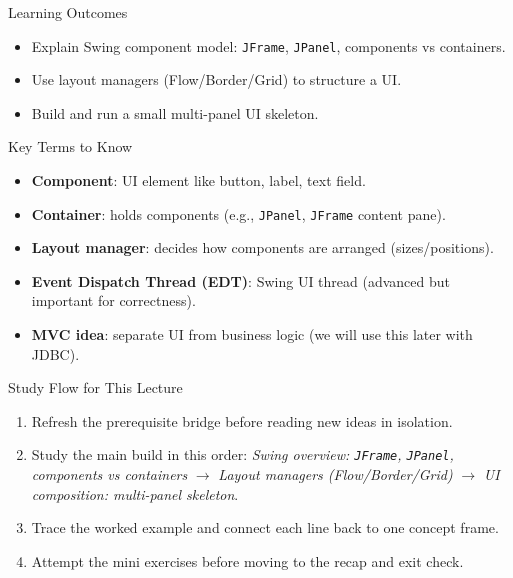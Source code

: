 \documentclass{beamer}
\begin{document}
\begin{frame}{Learning Outcomes}
  \begin{itemize}[<+->]
    \item Explain Swing component model: \texttt{JFrame}, \texttt{JPanel}, components vs containers.
    \item Use layout managers (Flow/Border/Grid) to structure a UI.
    \item Build and run a small multi-panel UI skeleton.
  \end{itemize}
  \slidesources{\OOPSUnitIVSources}
\end{frame}

\begin{frame}{Key Terms to Know}
\begin{itemize}[<+->]
  \item \textbf{Component}: UI element like button, label, text field.
  \item \textbf{Container}: holds components (e.g., \texttt{JPanel}, \texttt{JFrame} content pane).
  \item \textbf{Layout manager}: decides how components are arranged (sizes/positions).
  \item \textbf{Event Dispatch Thread (EDT)}: Swing UI thread (advanced but important for correctness).
  \item \textbf{MVC idea}: separate UI from business logic (we will use this later with JDBC).
\end{itemize}
  \slidesources{\OOPSUnitIVSources}
\end{frame}

\begin{frame}{Study Flow for This Lecture}
\begin{enumerate}[<+->]
  \item Refresh the prerequisite bridge before reading new ideas in isolation.
  \item Study the main build in this order: \textit{Swing overview: \texttt{JFrame}, \texttt{JPanel}, components vs containers} $\rightarrow$ \textit{Layout managers (Flow/Border/Grid)} $\rightarrow$ \textit{UI composition: multi-panel skeleton}.
  \item Trace the worked example and connect each line back to one concept frame.
  \item Attempt the mini exercises before moving to the recap and exit check.
\end{enumerate}
  \slidesources{\OOPSUnitIVSources}
\end{frame}
\end{document}
